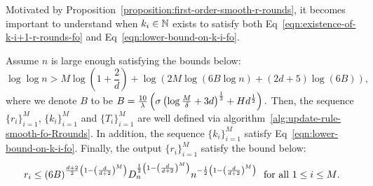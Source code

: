 \newcommand{\residual}{\text{residual}}

Motivated by Proposition~\ref{proposition:first-order-smooth-r-rounds}, it becomes 
important to understand when $k_i \in \mathbb{N}$ exists to satisfy both 
Eq~\eqref{eqn:existence-of-k-i+1-r-rounds-fo} and Eq~\eqref{eqn:lower-bound-on-k-i-fo}.

\begin{lemma}
\label{lemma:ef-first-order-smooth-r-rounds}
Assume $n$ is large enough satisfying the bounds below: 
\begin{equation}
\label{eqn:ef-n-condition-fo-smooth-r-rounds}
\log \log n > M \log \left(1+ \frac{2}{d}\right)
	+ \log \left(2M \log(6B \log n) + (2d+5)\log (6B)\right), 
\end{equation}
where we denote $B$ to be $
B = \frac{10}{\lambda} \left(\sigma \left(\log \frac{M}{\delta} + 3d\right)^{\frac{1}{2}} + H d^{\frac{1}{2}} \right).
$
Then, the sequence $\{r_i\}_{i=1}^M$, $\{k_i\}_{i=1}^M$ and $\{T_i\}_{i=1}^M$ are 
well defined via algorithm~\ref{alg:update-rule-smooth-fo-Rrounds}. In addition, 
the sequence $\{k_i\}_{i=1}^M$ satisfy Eq~\eqref{eqn:lower-bound-on-k-i-fo}.
Finally, the output $\{r_i\}_{i=1}^M$ satisfy the bound below: 
\begin{equation*}
r_i \leq (6B)^{\frac{d+2}{2} \left(1-\left(\frac{d}{d+2}\right)^M\right)}
		D_n^{\frac{1}{2} \left(1 - \left(\frac{d}{d+2}\right)^M\right)}
		n^{-\frac{1}{2} \left(1 - \left(\frac{d}{d+2}\right)^M\right)}~~\text{for all $1\leq i\leq M$}.
\end{equation*}
\end{lemma}
